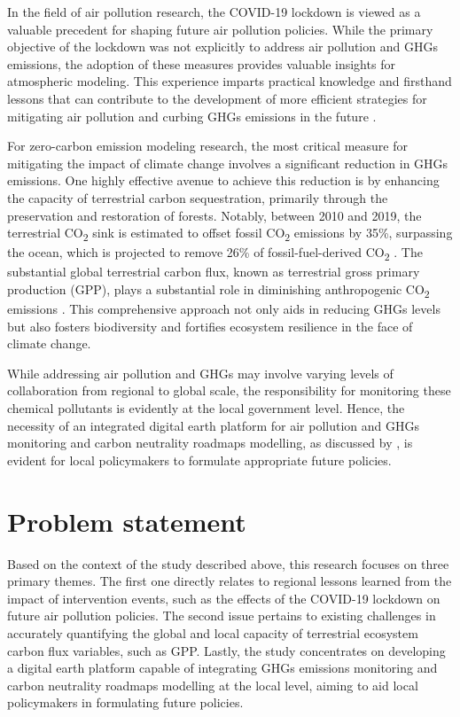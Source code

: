 In the field of air pollution research, the COVID-19 lockdown is viewed as a valuable precedent for shaping future air pollution policies. While the primary objective of the lockdown was not explicitly to address air pollution and GHGs emissions, the adoption of these measures provides valuable insights for atmospheric modeling. This experience imparts practical knowledge and firsthand lessons that can contribute to the development of more efficient strategies for mitigating air pollution and curbing GHGs emissions in the future \citep{grange2021covid}. \par

For zero-carbon emission modeling research, the most critical measure for mitigating the impact of climate change involves a significant reduction in GHGs emissions. One highly effective avenue to achieve this reduction is by enhancing the capacity of terrestrial carbon sequestration, primarily through the preservation and restoration of forests. Notably, between 2010 and 2019, the terrestrial CO\textsubscript{2} sink is estimated to offset fossil CO\textsubscript{2} emissions by 35\%, surpassing the ocean, which is projected to remove 26\% of fossil-fuel-derived CO\textsubscript{2} \citep{friedlingstein2020global, wang2022disentangling}. The substantial global terrestrial carbon flux, known as terrestrial gross primary production (GPP), plays a substantial role in diminishing anthropogenic CO\textsubscript{2} emissions \citep{beer2010terrestrial}. This comprehensive approach not only aids in reducing GHGs levels but also fosters biodiversity and fortifies ecosystem resilience in the face of climate change. \par

While addressing air pollution and GHGs may involve varying levels of collaboration from regional to global scale, the responsibility for monitoring these chemical pollutants is evidently at the local government level. Hence, the necessity of an integrated digital earth platform for air pollution and GHGs monitoring and carbon neutrality roadmaps modelling, as discussed by \citep{fukui2021digital}, is evident for local policymakers to formulate appropriate future policies. \par

\section{Problem statement}
Based on the context of the study described above, this research focuses on three primary themes. The first one directly relates to regional lessons learned from the impact of intervention events, such as the effects of the COVID-19 lockdown on future air pollution policies. The second issue pertains to existing challenges in accurately quantifying the global and local capacity of terrestrial ecosystem carbon flux variables, such as GPP. Lastly, the study concentrates on developing a digital earth platform capable of integrating GHGs emissions monitoring and carbon neutrality roadmaps modelling at the local level, aiming to aid local policymakers in formulating future policies. \par


